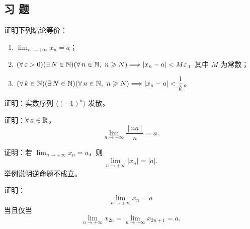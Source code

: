 \subsection*{习 题}
\begin{exercise}
  \item 证明下列结论等价：
  \begin{enumerate}[label=\arabic*)]
    \item \(\displaystyle\lim_{n\to+\infty}x_n=a\)；
    \item \((\forall\,\varepsilon>0)(\exists\,N\in\mathbb{N})
      (\forall\,n\in\mathbb{N},\ n\geqslant N)
      \Longrightarrow |x_n-a|<M\varepsilon\)，其中 \(M\) 为常数；
    \item \((\forall\,k\in\mathbb{N})(\exists\,N\in\mathbb{N})
      (\forall\,n\in\mathbb{N},\ n\geqslant N)
      \Longrightarrow |x_n-a|<\dfrac1k\)。
  \end{enumerate}
\end{exercise}

\begin{exercise}
  \item 证明：实数序列 \(\langle(-1)^n\rangle\) 发散。
\end{exercise}

\begin{exercise}
  \item 证明：\(\forall\,a\in\mathbb{R}\)，
  \[
  \lim_{n\to+\infty}\frac{[na]}n=a.
  \]
\end{exercise}

\begin{exercise}
  \item 证明：若 \(\displaystyle\lim_{n\to+\infty}x_n=a\)，则
  \[
  \lim_{n\to+\infty}|x_n|=|a|.
  \]
  举例说明逆命题不成立。
\end{exercise}

\begin{exercise}
  \item 证明：
  \[
  \lim_{n\to+\infty}x_n=a
  \]
  当且仅当
  \[
  \lim_{n\to+\infty}x_{2n}
  =\lim_{n\to+\infty}x_{2n+1}=a.
  \]
\end{exercise}

